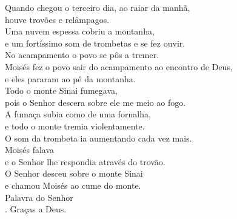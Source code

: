 \documentclass{book}
\begin{document}
\begin{flushleft}
    Quando chegou o terceiro dia, ao raiar da manhã, \\
    houve trovões e relâmpagos. \\
    Uma nuvem espessa cobriu a montanha, \\
    e um fortíssimo som de trombetas e se fez ouvir. \\
    No acampamento o povo se pôs a tremer. \\
    Moisés fez o povo sair do acampamento ao encontro de Deus, \\
    e eles pararam ao pé da montanha. \\
    Todo o monte Sinai fumegava, \\
    pois o Senhor descera sobre ele me meio ao fogo. \\
    A fumaça subia como de uma fornalha, \\
    e todo o monte tremia violentamente. \\
    O som da trombeta ia aumentando cada vez mais. \\
    Moisés falava \\
    e o Senhor lhe respondia através do trovão. \\
    O Senhor desceu sobre o monte Sinai \\
    e chamou Moisés ao cume do monte.
    \vspace{.1cm} \\
    Palavra do Senhor \\
    {\color{red} \Rbar.} Graças a Deus.

    \newpage


\end{flushleft}
\end{document}

